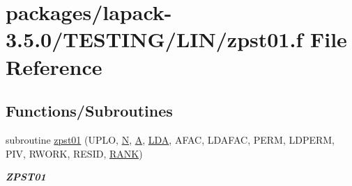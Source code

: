 \hypertarget{zpst01_8f}{}\section{packages/lapack-\/3.5.0/\+T\+E\+S\+T\+I\+N\+G/\+L\+I\+N/zpst01.f File Reference}
\label{zpst01_8f}
\subsection*{Functions/\+Subroutines}
\begin{DoxyCompactItemize}
\item 
subroutine \hyperlink{group__complex16__lin_ga300ddc900d24cfb5370a648a85292d3a}{zpst01} (U\+P\+L\+O, \hyperlink{polmisc_8c_a0240ac851181b84ac374872dc5434ee4}{N}, \hyperlink{classA}{A}, \hyperlink{example__user_8c_ae946da542ce0db94dced19b2ecefd1aa}{L\+D\+A}, A\+F\+A\+C, L\+D\+A\+F\+A\+C, P\+E\+R\+M, L\+D\+P\+E\+R\+M, P\+I\+V, R\+W\+O\+R\+K, R\+E\+S\+I\+D, \hyperlink{splinemodule_8c_a3a88bcc63386de30443dacede2e01847}{R\+A\+N\+K})
\begin{DoxyCompactList}\small\item\em {\bfseries Z\+P\+S\+T01} \end{DoxyCompactList}\end{DoxyCompactItemize}

